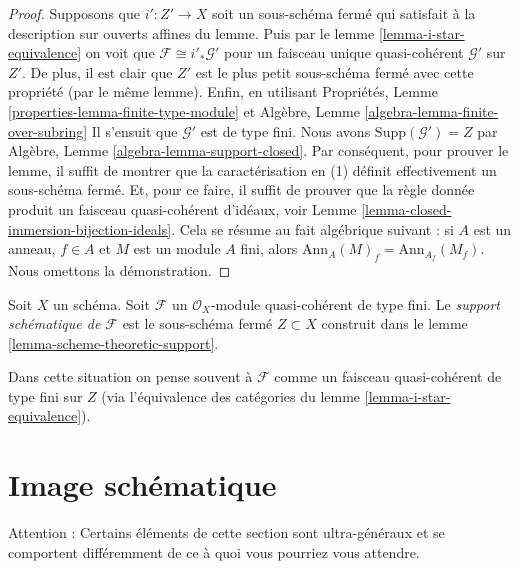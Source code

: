 \begin{proof}
Supposons que $i' : Z' \to X$ soit un sous-schéma fermé qui satisfait
à la description sur ouverts affines
du lemme. Puis par le lemme \ref{lemma-i-star-equivalence}
on voit que $\mathcal{F} \cong i'_*\mathcal{G}'$ pour un faisceau unique
quasi-cohérent $\mathcal{G}'$ sur $Z'$. De plus, il
est clair que $Z'$ est le plus petit sous-schéma fermé
avec cette propriété
(par le même lemme). Enfin, en utilisant Propriétés,
Lemme
\ref{properties-lemma-finite-type-module} et Algèbre, Lemme \ref{algebra-lemma-finite-over-subring}
Il s'ensuit que $\mathcal{G}'$ est de type fini.
Nous avons $\text{Supp}(\mathcal{G}') = Z$ par
Algèbre, Lemme \ref{algebra-lemma-support-closed}. Par conséquent, pour
prouver le lemme, il suffit de montrer que la caractérisation
en (1) définit effectivement un sous-schéma fermé. Et,
pour ce faire, il suffit de prouver que la règle donnée
produit un faisceau quasi-cohérent d'idéaux,
voir Lemme \ref{lemma-closed-immersion-bijection-ideals}. Cela se résume au fait
algébrique suivant : si $A$ est un anneau, $f \in A$ et $M$
est un module $A$
fini, alors $\text{Ann}_A(M)_f = \text{Ann}_{A_f}(M_f)$. Nous omettons la
démonstration.
\end{proof}

\begin{definition}
\label{definition-scheme-theoretic-support}
Soit $X$ un schéma. Soit $\mathcal{F}$ un $\mathcal{O}_X$-module
quasi-cohérent de type fini. Le {\it support
schématique de $\mathcal{F}$} est le sous-schéma fermé $Z \subset X$
construit dans le lemme \ref{lemma-scheme-theoretic-support}.
\end{definition}

\noindent
Dans cette situation on pense souvent à $\mathcal{F}$ comme un faisceau
quasi-cohérent de type fini sur $Z$ (via l'équivalence
des catégories du lemme \ref{lemma-i-star-equivalence}).













\section{Image schématique}
\label{section-scheme-theoretic-image}

\noindent
Attention : Certains éléments de cette section sont ultra-généraux et se comportent
différemment de ce à quoi vous pourriez vous attendre.

